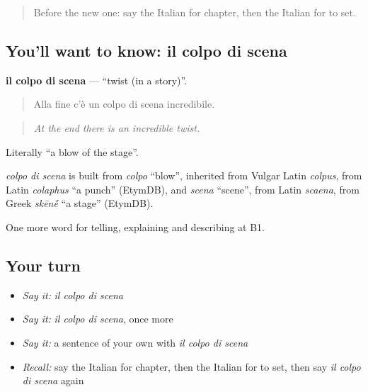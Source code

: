 \begin{quote}
Before the new one: say the Italian for chapter, then the Italian for to set.
\end{quote}

\subsection*{You'll want to know: il colpo di scena}
\textbf{il colpo di scena} — \textquotedblleft{}twist (in a story)\textquotedblright{}.

\begin{quote}
Alla fine c'è un colpo di scena incredibile.
\end{quote}

\begin{quote}
\emph{At the end there is an incredible twist.}
\end{quote}

Literally \textquotedblleft{}a blow of the stage\textquotedblright{}.

\begin{cousinweb}
\emph{colpo di scena} is built from \emph{colpo} \textquotedblleft{}blow\textquotedblright{}, inherited from Vulgar Latin \emph{colpus}, from Latin \emph{colaphus} \textquotedblleft{}a punch\textquotedblright{} (EtymDB), and \emph{scena} \textquotedblleft{}scene\textquotedblright{}, from Latin \emph{scaena}, from Greek \emph{skēn\'{\={e}}} \textquotedblleft{}a stage\textquotedblright{} (EtymDB).
\end{cousinweb}

\begin{grammarlens}[title={What you've built}]
One more word for telling, explaining and describing at B1.
\end{grammarlens}

\subsection*{Your turn}
\begin{itemize}
\raggedright
  \item \emph{Say it:} \emph{il colpo di scena}
  \item \emph{Say it:} \emph{il colpo di scena}, once more
  \item \emph{Say it:} a sentence of your own with \emph{il colpo di scena}
  \item \emph{Recall:} say the Italian for chapter, then the Italian for to set, then say \emph{il colpo di scena} again
\end{itemize}

